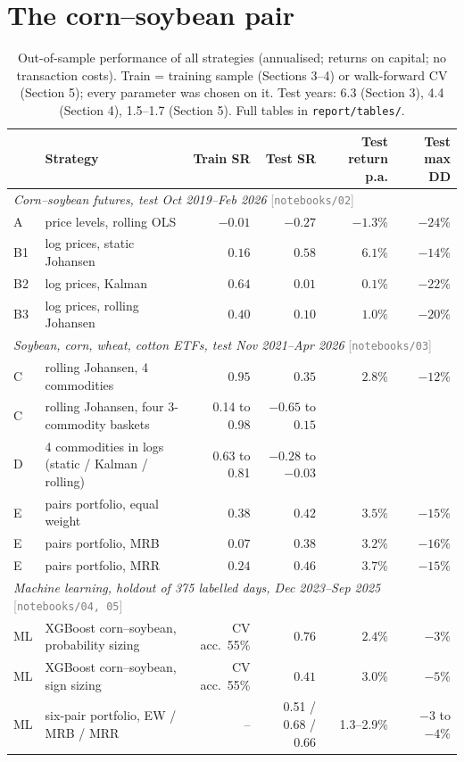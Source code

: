 \documentclass[11pt,a4paper]{article}
\newcommand{\nb}[1]{\textcolor{gray}{\small[\texttt{notebooks/#1}]}}
\begin{document}
\section{The corn--soybean pair}\label{sec:pair}
\begin{table}[t]
\centering\small
\caption{Out-of-sample performance of all strategies (annualised; returns on capital; no transaction costs). Train =
training sample (Sections 3--4) or walk-forward CV (Section 5); every parameter was chosen on it. Test years: 6.3
(Section 3), 4.4 (Section 4), 1.5--1.7 (Section 5). Full tables in \texttt{report/tables/}.}
\label{tab:results}
\begin{tabular}{llrrrr}
\toprule
& Strategy & Train SR & Test SR & Test return p.a. & Test max DD \\
\midrule
\multicolumn{6}{l}{\emph{Corn--soybean futures, test Oct 2019--Feb 2026} \nb{02}}\\
A  & price levels, rolling OLS          & $-0.01$ & $-0.27$ & $-1.3\%$ & $-24\%$ \\
B1 & log prices, static Johansen        & $0.16$  & $0.58$  & $6.1\%$  & $-14\%$ \\
B2 & log prices, Kalman                 & $0.64$  & $0.01$  & $0.1\%$  & $-22\%$ \\
B3 & log prices, rolling Johansen       & $0.40$  & $0.10$  & $1.0\%$  & $-20\%$ \\
\midrule
\multicolumn{6}{l}{\emph{Soybean, corn, wheat, cotton ETFs, test Nov 2021--Apr 2026} \nb{03}}\\
C  & rolling Johansen, 4 commodities    & $0.95$  & $0.35$  & $2.8\%$  & $-12\%$ \\
C  & rolling Johansen, four 3-commodity baskets & 0.14 to 0.98 & $-0.65$ to $0.15$ & & \\
D  & 4 commodities in logs (static / Kalman / rolling) & 0.63 to 0.81 & $-0.28$ to $-0.03$ & & \\
E  & pairs portfolio, equal weight      & $0.38$  & $0.42$  & $3.5\%$  & $-15\%$ \\
E  & pairs portfolio, MRB               & $0.07$  & $0.38$  & $3.2\%$  & $-16\%$ \\
E  & pairs portfolio, MRR               & $0.24$  & $0.46$  & $3.7\%$  & $-15\%$ \\
\midrule
\multicolumn{6}{l}{\emph{Machine learning, holdout of 375 labelled days, Dec 2023--Sep 2025} \nb{04, 05}}\\
ML & XGBoost corn--soybean, probability sizing & CV acc.\ 55\% & $0.76$ & $2.4\%$ & $-3\%$ \\
ML & XGBoost corn--soybean, sign sizing & CV acc.\ 55\% & $0.41$ & $3.0\%$ & $-5\%$ \\
ML & six-pair portfolio, EW / MRB / MRR & -- & 0.51 / 0.68 / 0.66 & 1.3--2.9\% & $-3$ to $-4\%$ \\
\bottomrule
\end{tabular}
\end{table}
\end{document}
